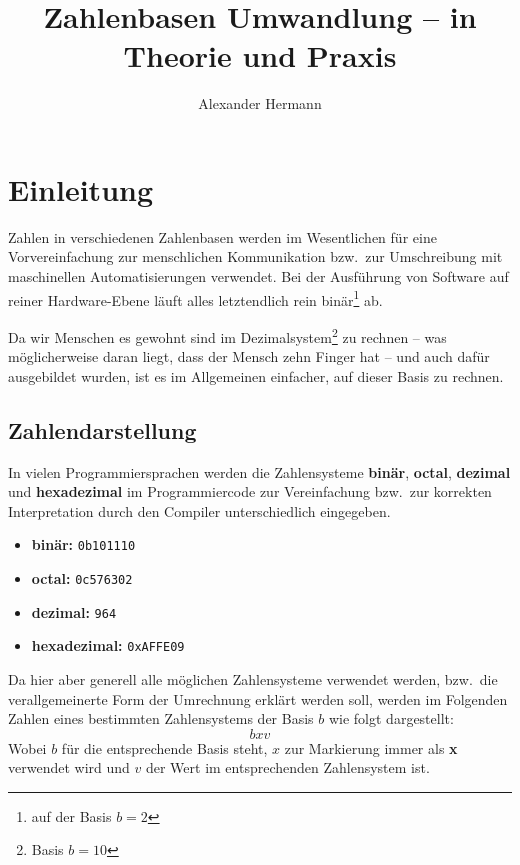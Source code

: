 \documentclass[a4paper,12pt,twoside]{book}
\title{Zahlenbasen Umwandlung -- in Theorie und Praxis}
\author{Alexander Hermann}
\begin{document}
\maketitle
\tableofcontents
\lstlistoflistings 
\listoffigures

\chapter{Einleitung}
Zahlen in verschiedenen Zahlenbasen werden im Wesentlichen für eine Vorvereinfachung zur menschlichen Kommunikation bzw.\ zur Umschreibung mit maschinellen Automatisierungen verwendet. 
Bei der Ausführung von Software auf reiner Hardware-Ebene läuft alles letztendlich rein binär\footnote{auf der Basis $b = 2$} ab. 

Da wir Menschen es gewohnt sind im Dezimalsystem\footnote{Basis $b = 10$} zu rechnen -- was möglicherweise daran liegt, dass der Mensch zehn Finger hat -- und auch dafür ausgebildet wurden, ist es im Allgemeinen einfacher, auf dieser Basis zu rechnen.
\section{Zahlendarstellung}
In vielen Programmiersprachen werden die Zahlensysteme \textbf{binär}, \textbf{octal}, \textbf{dezimal} und \textbf{hexadezimal} im Programmiercode zur Vereinfachung bzw.\ zur korrekten Interpretation durch den Compiler unterschiedlich eingegeben.
\begin{itemize}
	\item \textbf{binär:} \texttt{0b101110}
	\item \textbf{octal:} \texttt{0c576302}
	\item \textbf{dezimal:} \texttt{964}
	\item \textbf{hexadezimal:} \texttt{0xAFFE09}
\end{itemize}
Da hier aber generell alle möglichen Zahlensysteme verwendet werden, bzw.\ die verallgemeinerte Form der Umrechnung erklärt werden soll, werden im Folgenden Zahlen eines bestimmten Zahlensystems der Basis $b$ wie folgt dargestellt:
\[bxv\]
Wobei $b$ für die entsprechende Basis steht, $x$ zur Markierung immer als \textbf{x} verwendet wird und $v$ der Wert im entsprechenden Zahlensystem ist.
\end{document}
